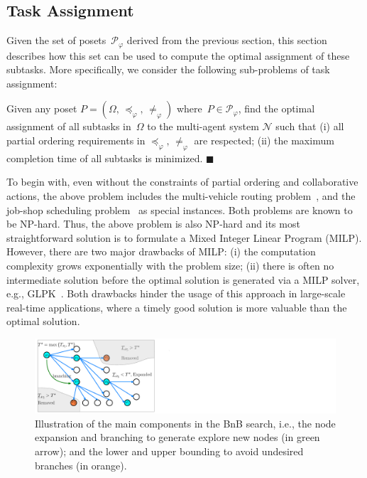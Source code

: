 \subsection{Task Assignment}\label{subsubsec:task-assignment}
Given the set of posets~$\mathcal{P}_{\varphi}$ derived from the previous
section, this section describes how this set can be used to compute
the optimal assignment of these subtasks. More specifically, we consider
the following sub-problems of task assignment:

\begin{problem}\label{problem:}
Given any poset $P=(\Omega,\, \preceq_{\varphi},\, \neq_{\varphi})$
where~$P\in \mathcal{P}_{\varphi}$,
find the optimal assignment of all subtasks in~$\Omega$ to the multi-agent system
$\mathcal{N}$ such that
(i) all partial ordering requirements in $\preceq_{\varphi},\, \neq_{\varphi}$ are
respected; (ii) the maximum completion time of all subtasks is minimized.
\hfill $\blacksquare$
\end{problem}



To begin with, even without the constraints of partial ordering
and collaborative actions, the above problem includes the multi-vehicle routing
problem~\citep{khamis2015multi},
and the job-shop scheduling problem~\citep{morrison2016branch} as special instances.
Both problems are known to be NP-hard.
Thus, the above problem is also NP-hard and its most straightforward solution
is to formulate a Mixed Integer Linear Program (MILP).
{However, there are two major drawbacks of MILP:
(i) the computation complexity grows exponentially with the problem size;
(ii) there is often no intermediate solution before the optimal solution is generated via a MILP solver,
  e.g., GLPK~\citep{makhorin2008glpk}.
Both drawbacks hinder the usage of this approach in large-scale real-time applications,
where a timely good solution is more valuable than the optimal solution.}

\begin{figure}[t!]
	\centering
	\includegraphics[width=0.9\linewidth]{figures/bnb_graph3.pdf}
	\caption{
		Illustration of the main components in the BnB search,
		i.e., the node expansion and branching to generate explore new nodes (in green arrow);
		and the lower and upper bounding to avoid undesired branches (in orange).}
	\label{fig:bnb_search_logic}
\end{figure}

